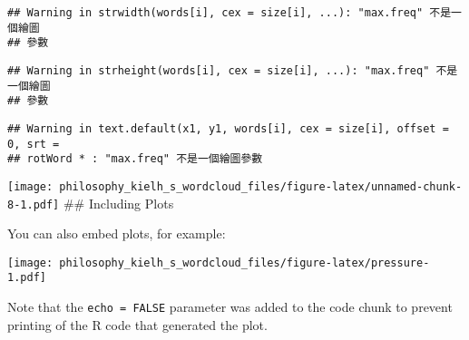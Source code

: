 \documentclass[]{article}
\begin{document}
\begin{verbatim}
## Warning in strwidth(words[i], cex = size[i], ...): "max.freq" 不是一個繪圖
## 參數
\end{verbatim}

\begin{verbatim}
## Warning in strheight(words[i], cex = size[i], ...): "max.freq" 不是一個繪圖
## 參數
\end{verbatim}

\begin{verbatim}
## Warning in text.default(x1, y1, words[i], cex = size[i], offset = 0, srt =
## rotWord * : "max.freq" 不是一個繪圖參數
\end{verbatim}

\texttt{[image: philosophy\_kielh\_s\_wordcloud\_files/figure-latex/unnamed-chunk-8-1.pdf]}
\#\# Including Plots

You can also embed plots, for example:

\texttt{[image: philosophy\_kielh\_s\_wordcloud\_files/figure-latex/pressure-1.pdf]}

Note that the \texttt{echo\ =\ FALSE} parameter was added to the code
chunk to prevent printing of the R code that generated the plot.
\end{document}
